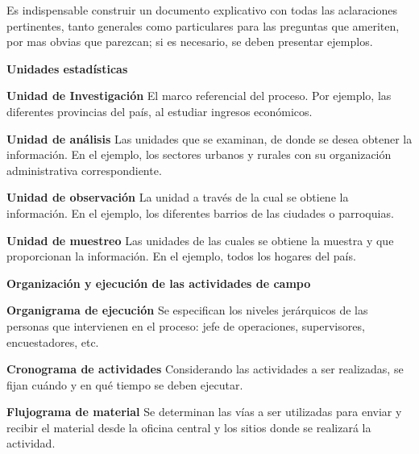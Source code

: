 \documentclass[a5paper,doc,10pt,noapacite]{apa6}
\newcommand{\neodefi}[1]{%
	\vspace{1\baselineskip}
	\textbf{\small#1} \newline
}
\begin{document}
{{	Es indispensable construir un documento explicativo con todas las aclaraciones pertinentes, tanto generales como particulares para las preguntas que ameriten, por mas obvias que parezcan; si es necesario, se deben presentar ejemplos.
	
	
	
\neodefi{Unidades estadísticas}
	
	\textbf{Unidad de Investigación}\newline
	El marco referencial del proceso. Por ejemplo, las diferentes provincias del país, al estudiar ingresos económicos.
	
	\vspace{0.75\baselineskip}
	\textbf{Unidad de análisis}\newline
	Las unidades que se examinan, de donde se desea obtener la información. 
	En el ejemplo, los sectores urbanos y rurales con su organización administrativa correspondiente.
	
\newpage	
	
	\vspace{0.75\baselineskip}
	\textbf{Unidad de observación}\newline
	La unidad a través de la cual se obtiene la información. En el ejemplo, los diferentes barrios de las ciudades o parroquias.
	
	\vspace{0.75\baselineskip}
	\textbf{Unidad de muestreo}\newline
	Las unidades de las cuales se obtiene la muestra y que proporcionan la información. En el ejemplo, todos los hogares del país.
	
	
\neodefi{Organización y ejecución de las actividades de campo}
	
	\textbf{Organigrama de ejecución}\newline
	Se especifican los niveles jerárquicos de las personas que intervienen en el proceso: jefe de operaciones, supervisores, encuestadores, etc.
	
	\vspace{0.75\baselineskip}
	\textbf{Cronograma de actividades}\newline
	Considerando las actividades a ser realizadas, se fijan cuándo y en qué tiempo se deben ejecutar.
	
	\vspace{0.75\baselineskip}
	\textbf{Flujograma de material}\newline
	Se determinan las vías a ser utilizadas para enviar y recibir el material desde la oficina central y los sitios donde se realizará la actividad.
	
}}
\end{document}
